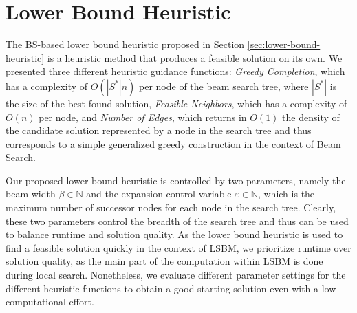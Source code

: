 \documentclass[draft,final]{vutinfth} %
\begin{document}
\section{Lower Bound Heuristic}\label{sec:lbh}
The BS-based lower bound heuristic proposed in Section \ref{sec:lower-bound-heuristic} is a heuristic method that produces a feasible solution on its own. We presented three different heuristic guidance functions: \emph{Greedy Completion}, which has a complexity of $O(|S^*|n)$ per node of the beam search tree, where $|S^*|$ is the size of the best found solution, \emph{Feasible Neighbors}, which has a complexity of $O(n)$ per node, and \emph{Number of Edges}, which returns in $O(1)$ the density of the candidate solution represented by a node in the search tree and thus corresponds to a simple generalized greedy construction in the context of Beam Search. 

Our proposed lower bound heuristic is controlled by two parameters, namely the beam width $\beta \in \mathbb{N}$ and the expansion control variable $\varepsilon \in \mathbb{N}$, which is the maximum number of successor nodes for each node in the search tree. Clearly, these two parameters control the breadth of the search tree and thus can be used to balance runtime and solution quality. 
As the lower bound heuristic is used to find a feasible solution quickly in the context of LSBM, we prioritize runtime over solution quality, as the main part of the computation within LSBM is done during local search. Nonetheless, we evaluate different parameter settings for the different heuristic functions to obtain a good starting solution even with a low computational effort. 
\end{document}

